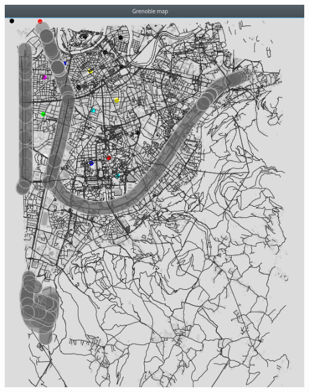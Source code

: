 \documentclass[12pt,a4paper]{article}
\begin{document}
\includegraphics[height=23cm]{map.png}
\end{document}

